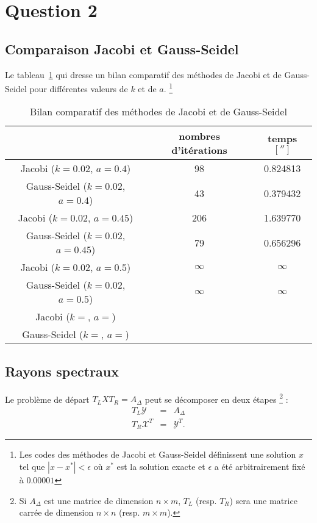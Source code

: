 \section{Question 2}
\subsection{Comparaison Jacobi et Gauss-Seidel}
Le tableau~\ref{tab:bench} qui dresse un bilan comparatif des méthodes de Jacobi et de Gauss-Seidel pour différentes valeurs de $k$ et de $a$.
\footnote{Les codes des méthodes de Jacobi et Gauss-Seidel définissent une solution $x$
tel que $|x-x^*|<\epsilon$ où $x^*$ est la solution exacte et $\epsilon$ a été arbitrairement fixé à $0.00001$}

\begin{table}
  \centering
  \begin{tabular}{|c|c|c|}
    \hline
    & nombres d'itérations & temps $[\second]$\\
    \hline
    Jacobi ($k=0.02$, $a=0.4$) &98 &  0.824813\\
    Gauss-Seidel ($k=0.02$, $a=0.4$) &43 & 0.379432 \\
    \hline
    Jacobi ($k=0.02$, $a=0.45$) &206 & 1.639770\\
    Gauss-Seidel ($k=0.02$, $a=0.45$) & 79 & 0.656296 \\
    \hline
    Jacobi ($k=0.02$, $a=0.5$) & $\infty$ & $\infty$\\
    Gauss-Seidel ($k=0.02$, $a=0.5$) & $\infty$ & $\infty$\\
    \hline
    Jacobi ($k=$, $a=$) & & \\
    Gauss-Seidel ($k=$, $a=$) & & \\
    \hline
  \end{tabular}
  \caption{Bilan comparatif des méthodes de Jacobi et de Gauss-Seidel}
  \label{tab:bench}
\end{table}

\subsection{Rayons spectraux}
Le problème de départ $T_L X T_R = A_{\Delta}$ peut se décomposer en deux étapes \footnote{Si $A_{\Delta}$
est une matrice de dimension $n \times m$, $T_L$ (resp. $T_R$) sera une matrice carrée de dimension $n \times n$ (resp. $m \times m$).} :
\begin{eqnarray}
  \label{eq_q2}
  T_L \mathcal{Y} &=& A_{\Delta}\\
  T_R \mathcal{X}^T &=& \mathcal{Y}^T.
\end{eqnarray}

